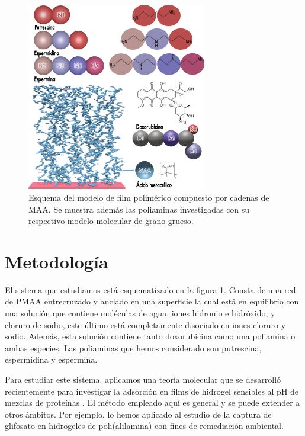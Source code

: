 \begin{figure}[!htb]
	\centering
	\includegraphics[width=0.7\textwidth]{Figures/graph-film/poliamines_model.pdf}
	\caption{Esquema del modelo  de  film polim\'erico compuesto por cadenas de MAA. Se muestra adem\'as las poliaminas investigadas  con su respectivo modelo molecular de grano grueso.}
	\label{fig:film:model_poliamines}
\end{figure}





\section{Metodolog\'ia}


El sistema que estudiamos est\'a esquematizado en la figura \ref{fig:film:model_poliamines}.
Consta de una  red de PMAA entrecruzado y anclado en una superficie  la cual est\'a en equilibrio con una soluci\'on que contiene mol\'eculas de agua, iones hidronio e hidr\'oxido, y cloruro de sodio, este \'ultimo est\'a completamente disociado en iones cloruro y sodio.
Adem\'as, esta soluci\'on contiene tanto doxorubicina como una poliamina o ambas especies.
Las poliaminas que hemos considerado son putrescina, espermidina y espermina.

Para estudiar este sistema, aplicamos una teor\'ia molecular que se desarroll\'o recientemente para investigar la adsorci\'on en films de hidrogel sensibles al pH de mezclas de prote\'inas \cite{Hagemann2018, longo2019protonation}.
El m\'etodo empleado aqu\'i es general y se puede extender a otros \'ambitos. Por ejemplo, lo hemos aplicado al estudio de la captura de glifosato en hidrogeles de poli(alilamina) \cite{PerezChavez2018} con fines de remediaci\'on ambiental.

